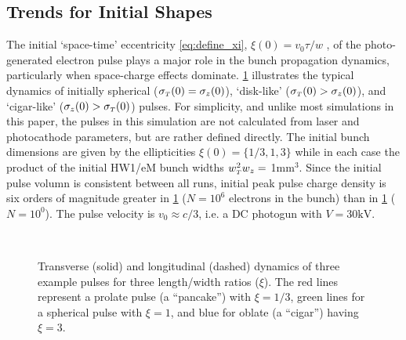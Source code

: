 \subsection{Trends for Initial Shapes}

The initial `space-time' eccentricity \ref{eq:define_xi}, $\xi ( 0 ) = v_{{ \scriptscriptstyle 0}} \tau / w $ , of the photo-generated electron pulse plays a major role in the bunch propagation dynamics, particularly when space-charge effects dominate.
\ref{fig:compare_shape} illustrates the typical dynamics of initially spherical ($ \sigma_{ {\scriptscriptstyle T} }(0) = \sigma_{z} ( 0 ) $), `disk-like' ($ \sigma_{ {\scriptscriptstyle T} } ( 0 ) > \sigma_{ z } ( 0 ) $), and `cigar-like' ($ \sigma_{ z } ( 0 ) > \sigma_{ {\scriptscriptstyle T} } ( 0 ) $) pulses.
For simplicity, and unlike most simulations in this paper, the pulses in this simulation are not calculated from laser and photocathode parameters, but are rather defined directly.
The initial bunch dimensions are given by the ellipticities $ \xi(0) = \{ 1/3 , 1 , 3 \} $ while in each case the product of the initial HW1/eM bunch widths $w_{{\scriptscriptstyle T}}^2 w_z = $ 1mm$^3$.
Since the initial pulse volumn is consistent between all runs, initial peak pulse charge density is six orders of magnitude greater in \ref{fig:compare_shape} ($ N = 10^{6} $ electrons in the bunch) than in \ref{fig:compare_shape} ($ N = 10^{0} $).
The pulse velocity is $ v_{{ \scriptscriptstyle 0}} \approx c/3 $, i.e. a DC photogun with $V = 30\text{kV} $.

\begin{figure}
  \centering
  \subfloat[][]{
    \label{fig:compare_shape_N1}
    
  }
  \\
  \subfloat[][]{
    \label{fig:compare_shape_N1e6}
    
  }
  \caption[AG simulation of free-space pulse expansion]{
    Transverse (solid) and longitudinal (dashed) dynamics of three example pulses for three length/width ratios ($\xi$). 
    The red lines represent a prolate pulse (a ``pancake'') with $\xi=1/3$, green lines for a spherical pulse with $\xi=1$, and blue for oblate (a ``cigar'') having $\xi=3$.
  }
  \label{fig:compare_shape}
\end{figure}

